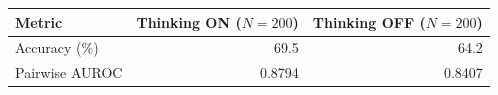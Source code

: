 \begin{tabular}{lrr}
\toprule
Metric & Thinking ON ($N=200$) & Thinking OFF ($N=200$) \\
\midrule
Accuracy (\%) & 69.5 & 64.2 \\
Pairwise AUROC & 0.8794 & 0.8407 \\
\bottomrule
\end{tabular}

